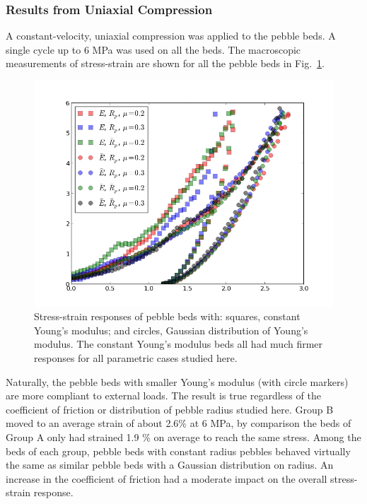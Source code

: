 \subsubsection{Results from Uniaxial Compression}


A constant-velocity, uniaxial compression was applied to the pebble beds. A single cycle up to 6 MPa was used on all the beds. The macroscopic measurements of stress-strain are shown for all the pebble beds in Fig.~\ref{fig:stress-strain}.

\begin{figure}[t]
  \centering
  \includegraphics[width=\singleimagewidth]{chapters/figures/stress-strain}
  \caption{Stress-strain responses of pebble beds with: squares, constant Young's modulus; and circles, Gaussian distribution of Young's modulus. The constant Young's modulus beds all had much firmer responses for all parametric cases studied here.}\label{fig:stress-strain}
\end{figure}

Naturally, the pebble beds with smaller Young’s modulus (with circle markers) are more compliant to external loads. The result is true regardless of the coefficient of friction or distribution of pebble radius studied here. Group B moved to an average strain of about 2.6\% at 6 MPa, by comparison the beds of Group A only had strained 1.9 \% on average to reach the same stress. Among the beds of each group, pebble beds with constant radius pebbles behaved virtually the same as similar pebble beds with a Gaussian distribution on radius. An increase in the coefficient of friction had a moderate impact on the overall stress-strain response. 


